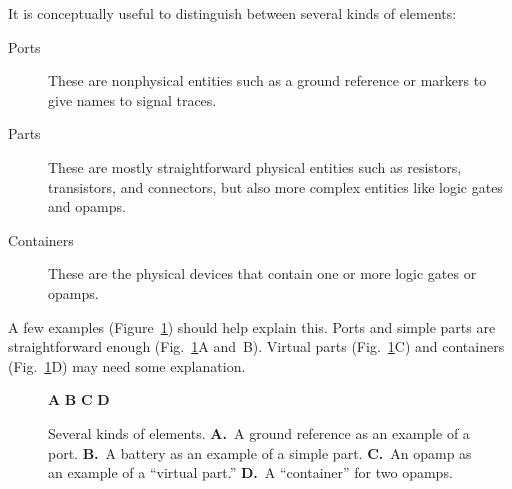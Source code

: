 \documentclass[11pt]{report}
\def\subfig#1#2{{\sf\small\bfseries#1}\raisebox{-.2in}{\raisebox{-.5\height}{\texttt{[image: \#2]}}}}
\begin{document}
It is conceptually useful to distinguish between several kinds of
elements:
\begin{description}
  \item[Ports] These are nonphysical entities such as a ground
    reference or markers to give names to signal traces.
    \item[Parts] These are mostly straightforward physical entities
      such as resistors, transistors, and connectors, but also more
      complex entities like logic gates and opamps.
    \item[Containers] These are the physical devices that contain
      one or more logic gates or opamps.
\end{description}

A few examples (Figure~\ref{parteg}) should help explain this. Ports
and simple parts are straightforward enough (Fig.~\ref{parteg}A
and~B). Virtual parts (Fig.~\ref{parteg}C) and containers
(Fig.~\ref{parteg}D) may need some explanation.

\begin{figure}[h]
  \mbox{}\hfill
  \subfig{A}{ug-ground}
  \hfill
  \subfig{B}{ug-battery}
  \hfill
  \subfig{C}{ug-opamp}
  \hfill
  \subfig{D}{ug-opamp-cont}
  \hfill\mbox{}
  \caption{Several kinds of elements. {\bf A.}~A ground reference as
    an example of a port. {\bf B.}~A battery as an example of a simple
    part. {\bf C.}~An opamp as an example of a ``virtual part.'' {\bf
      D.}~A ``container'' for two opamps.}\label{parteg}
\end{figure}
\end{document}
